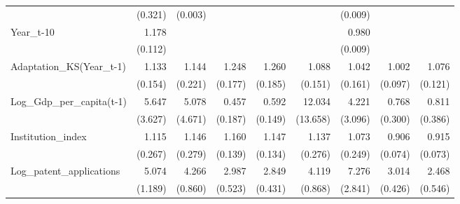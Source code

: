 \begin{table}[htbp]
\begin{tabular}{l*{8}{D{.}{.}{-1}}}
                    &     (0.321)         &     (0.003)         &                     &                     &                     &     (0.009)         &                     &                     \\
Year\_t-10           &       1.178\sym{*}  &                     &                     &                     &                     &       0.980\sym{**} &                     &                     \\
                    &     (0.112)         &                     &                     &                     &                     &     (0.009)         &                     &                     \\
Adaptation\_KS(Year\_t-1)&       1.133         &       1.144         &       1.248\sym{\%}  &       1.260\sym{\%}  &       1.088         &       1.042         &       1.002         &       1.076         \\
                    &     (0.154)         &     (0.221)         &     (0.177)         &     (0.185)         &     (0.151)         &     (0.161)         &     (0.097)         &     (0.121)         \\
Log\_Gdp\_per\_capita(t-1)&       5.647\sym{***}&       5.078\sym{*}  &       0.457\sym{*}  &       0.592\sym{**} &      12.034\sym{**} &       4.221\sym{**} &       0.768         &       0.811         \\
                    &     (3.627)         &     (4.671)         &     (0.187)         &     (0.149)         &    (13.658)         &     (3.096)         &     (0.300)         &     (0.386)         \\
Institution\_index   &       1.115         &       1.146         &       1.160         &       1.147         &       1.137         &       1.073         &       0.906         &       0.915         \\
                    &     (0.267)         &     (0.279)         &     (0.139)         &     (0.134)         &     (0.276)         &     (0.249)         &     (0.074)         &     (0.073)         \\
Log\_patent\_applications&       5.074\sym{***}&       4.266\sym{***}&       2.987\sym{***}&       2.849\sym{***}&       4.119\sym{***}&       7.276\sym{***}&       3.014\sym{***}&       2.468\sym{***}\\
                    &     (1.189)         &     (0.860)         &     (0.523)         &     (0.431)         &     (0.868)         &     (2.841)         &     (0.426)         &     (0.546)         \\

\end{tabular}
\end{table}
